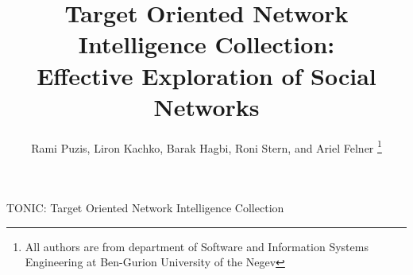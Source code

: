 \documentclass[journal]{IEEEtran}
\begin{document}
%
\title{Target Oriented Network Intelligence Collection: \\
Effective Exploration of Social Networks}
%
%
%

\author{Rami Puzis, Liron Kachko, Barak Hagbi, Roni Stern, and Ariel Felner
\thanks{All authors are from department of Software and Information Systems Engineering at Ben-Gurion University of the Negev}
}

% 
%



%
{TONIC: Target Oriented Network Intelligence Collection}
% 
\end{document}
